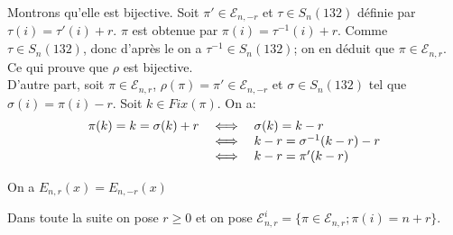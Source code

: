 Montrons qu'elle est bijective. Soit $\pi' \in \mathcal{E}_{n, -r}$ et $\tau\in S_{n}(132)$ définie par $\tau(i) = \tau'(i)+r$. $\pi$ est obtenue par $\pi(i)=\tau^{-1}(i) + r$. Comme $\tau\in S_{n}(132)$, donc d'après le  on a $\tau^{-1}\in S_{n}(132)$; on en déduit que $\pi \in \mathcal{E}_{n, r}$. Ce qui prouve que $\rho$ est bijective.\vspace{10pt}\\
D'autre part, soit $\pi \in \mathcal{E}_{n,r}$, $\rho(\pi)=\pi' \in \mathcal{E}_{n, -r}$ et $\sigma \in S_{n}(132)$ tel que $\sigma(i)=\pi(i)-r$. Soit $k\in Fix(\pi)$. On a:
\[
	\begin{array}{l l l}
		\pi(k) = k = \sigma(k)+r & \iff & \sigma(k) = k-r            \\
		                         & \iff & k-r = \sigma^{-1}(k-r) - r \\
		                         & \iff & k-r = \pi'(k-r)
	\end{array}
\]


\begin{corollaire}
	On a $E_{n,r}(x) = E_{n,-r}(x)$
\end{corollaire}
Dans toute la suite on pose $r \geq 0$ et on pose $\mathcal{E}_{n, r}^{i} = \{\pi \in \mathcal{E}_{n, r}; \pi(i)=n+r\}$.\\


